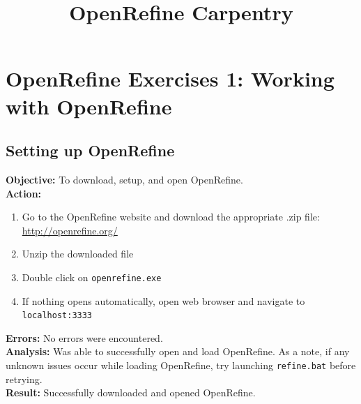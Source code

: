 \documentclass{article}
\begin{document}
\newpage
\title{OpenRefine Carpentry}
\maketitle
\newpage
\section{OpenRefine Exercises 1: Working with OpenRefine}
\subsection{Setting up OpenRefine}
\textbf{Objective:} To download, setup, and open OpenRefine.\\
\textbf{Action:}
\begin{enumerate}
    \item Go to the OpenRefine website and download the appropriate .zip file:\\
    \url{http://openrefine.org/}
    \item Unzip the downloaded file
    \item Double click on \texttt{openrefine.exe}
    \item If nothing opens automatically, open web browser and navigate to \texttt{localhost:3333}
\end{enumerate}
\textbf{Errors:} No errors were encountered.\\
\textbf{Analysis:} Was able to successfully open and load OpenRefine. As a note, if any unknown issues occur while loading OpenRefine, try launching \texttt{refine.bat} before retrying.\\
\textbf{Result:} Successfully downloaded and opened OpenRefine.
%
\end{document}
